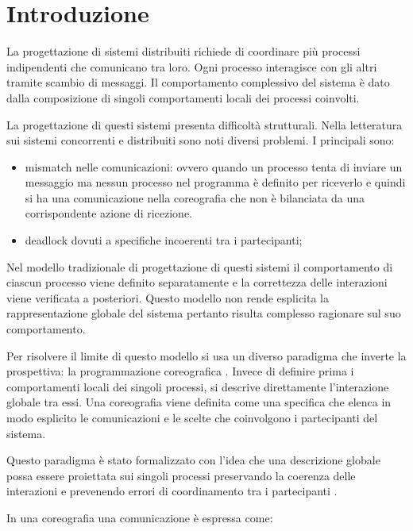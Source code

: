 \chapter{Introduzione}

La progettazione di sistemi distribuiti richiede di coordinare più processi indipendenti che comunicano tra loro. Ogni processo interagisce con gli altri tramite scambio di messaggi. Il comportamento complessivo del sistema è dato dalla composizione di singoli comportamenti locali dei processi coinvolti.

La progettazione di questi sistemi presenta difficoltà strutturali. Nella letteratura sui sistemi concorrenti e distribuiti sono noti diversi problemi. I principali sono:

\begin{itemize}
\item mismatch nelle comunicazioni: ovvero quando un processo tenta di inviare un messaggio ma nessun processo nel programma è definito per riceverlo e quindi si ha una comunicazione nella coreografia che non è bilanciata da una corrispondente azione di ricezione.
\item deadlock dovuti a specifiche incoerenti tra i partecipanti;
\end{itemize}

Nel modello tradizionale di progettazione di questi sistemi il comportamento di ciascun processo viene definito separatamente e la correttezza delle interazioni viene verificata a posteriori. Questo modello non rende esplicita la rappresentazione globale del sistema pertanto risulta complesso ragionare sul suo comportamento.

Per risolvere il limite di questo modello si usa un diverso paradigma che inverte la prospettiva: la programmazione coreografica \cite{montesi2023choreographies}. Invece di definire prima i comportamenti locali dei singoli processi, si descrive direttamente l’interazione globale tra essi. Una coreografia viene definita come una specifica che elenca in modo esplicito le comunicazioni e le scelte che coinvolgono i partecipanti del sistema.

Questo paradigma è stato formalizzato con l’idea che una descrizione globale possa essere proiettata sui singoli processi preservando la coerenza delle interazioni e prevenendo errori di coordinamento tra i partecipanti \cite{montesi2023choreographies,honda2016foundations}.

\bigskip

In una coreografia una comunicazione è espressa come:

